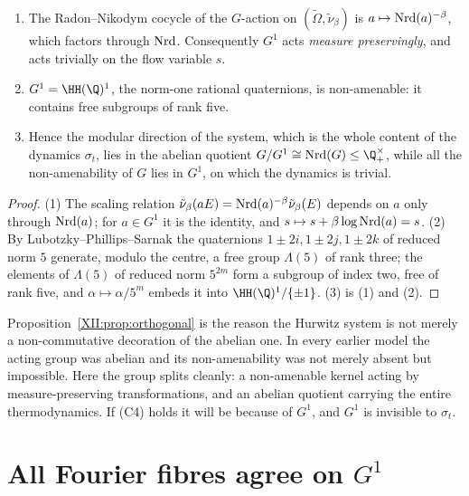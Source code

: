 \begin{proposition}\label{XII:prop:orthogonal}
\begin{enumerate}
\item The Radon--Nikodym cocycle of the $G$-action on $(\widetilde\Omega,\tilde\nu_\beta)$ is
$a\mapsto\operatorname{Nrd}(a)^{-\beta}$, which factors through $\operatorname{Nrd}$. Consequently $G^1$ acts
\emph{measure preservingly}, and acts trivially on the flow variable $s$.
\item $G^1=\HH(\Q)^1$, the norm-one rational quaternions, is non-amenable: it contains
free subgroups of rank five.
\item Hence the modular direction of the system, which is the whole content of the dynamics
$\sigma_t$, lies in the abelian quotient $G/G^1\cong\Nrd(G)\le\Q^\times_+$, while all the
non-amenability of $G$ lies in $G^1$, on which the dynamics is trivial.
\end{enumerate}
\end{proposition}

\begin{proof}
(1) The scaling relation $\tilde\nu_\beta(aE)=\operatorname{Nrd}(a)^{-\beta}\tilde\nu_\beta(E)$ depends on
$a$ only through $\operatorname{Nrd}(a)$; for $a\in G^1$ it is the identity, and
$s\mapsto s+\beta\log\operatorname{Nrd}(a)=s$. (2) By Lubotzky--Phillips--Sarnak \cite[\S3]{LPS} the
quaternions $1\pm2i,1\pm2j,1\pm2k$ of reduced norm $5$ generate, modulo the centre, a free
group $\Lambda(5)$ of rank three; the elements of $\Lambda(5)$ of reduced norm $5^{2m}$ form
a subgroup of index two, free of rank five, and $\alpha\mapsto\alpha/5^m$ embeds it into
$\HH(\Q)^1/\{\pm1\}$. (3) is (1) and (2).
\end{proof}

\begin{remark}\label{XII:rem:changes}
Proposition~\ref{XII:prop:orthogonal} is the reason the Hurwitz system is not merely a
non-commutative decoration of the abelian one. In every earlier model the acting group was
abelian and its non-amenability was not merely absent but impossible. Here the group splits
cleanly: a non-amenable kernel acting by measure-preserving transformations, and an abelian
quotient carrying the entire thermodynamics. If (C4) holds it will be because of $G^1$, and
$G^1$ is invisible to $\sigma_t$.
\end{remark}

\section{All Fourier fibres agree on $G^1$}

